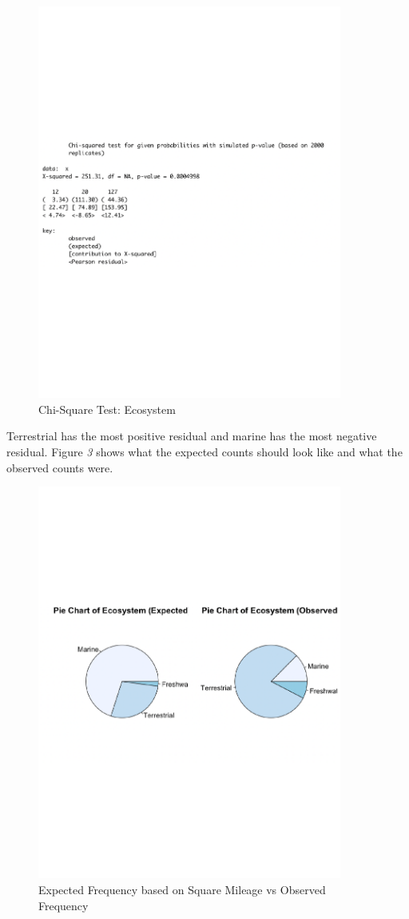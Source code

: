 \documentclass[
]{article}
\begin{document}
\begin{figure}
  \caption{Chi-Square Test: Ecosystem}
    \includegraphics[width=10cm]{chi-eco-2.pdf}
\end{figure}

Terrestrial has the most positive residual and marine has the most
negative residual. Figure \emph{3} shows what the expected counts should
look like and what the observed counts were.

\begin{figure}
  \caption{Expected Frequency based on Square Mileage vs Observed Frequency}
    \includegraphics[width=10cm]{pie-eco-2.pdf}
\end{figure}
\end{document}
